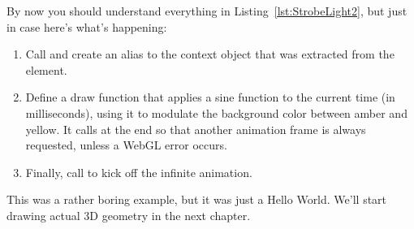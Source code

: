 By now you should understand everything in Listing~\ref{lst:StrobeLight2}, but just in case here's what's happening:

\begin{enumerate}
\item Call  and create an alias to the context object that was extracted from the  element.
\item Define a draw function that applies a sine function to the current time (in milliseconds), using it to modulate the background color between amber and yellow.  It calls  at the end so that another animation frame is always requested, unless a WebGL error occurs.
\item Finally, call  to kick off the infinite animation.
\end{enumerate}

This was a rather boring example, but it was just a Hello World.  We'll start drawing actual 3D geometry in the next chapter.
